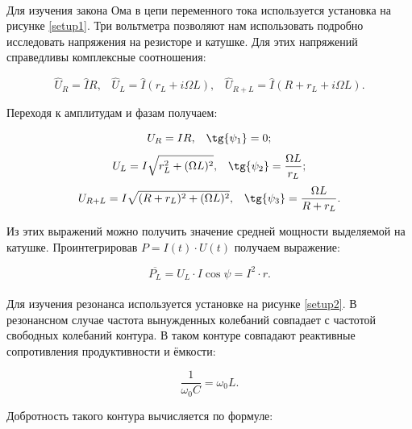 \documentclass[a4paper,12pt]{article} %
\begin{document}
\paragraph{} Для изучения закона Ома в цепи переменного тока используется установка на рисунке \ref{setup1}. Три вольтметра позволяют нам использовать подробно исследовать напряжения на резисторе и катушке. Для этих напряжений справедливы комплексные соотношения:

\begin{equation}
\hat{U}_R = \hat{I} R, \;\;\; \hat{U}_L = \hat{I} (r_L + i \Omega L), \;\;\; \hat{U}_{R+L} = \hat{I} (R + r_L + i\Omega L).
\label{1}
\end{equation}

Переходя к амплитудам и фазам получаем:

\begin{equation}
U_R = IR, \;\;\; \tg{\psi_1} = 0;  \label{2}
\end{equation}
\begin{equation}
U_L = I \sqrt{r_L^2 + (\Omega L)^2}, \;\;\; 	\tg{\psi_2} = \frac{\Omega L}{r_L};  \label{3}
\end{equation}
\begin{equation}
U_{R+L} = I \sqrt{(R + r_L)^2 + (\Omega L)^2}, \;\;\; 	\tg{\psi_3} = \frac{\Omega L}{R + r_L}.  \label{3}
\end{equation}

Из этих выражений можно получить значение средней мощности выделяемой на катушке. Проинтегрировав $P = I(t) \cdot U(t)$ получаем выражение:

\begin{equation}
\overline{P_L} = U_L \cdot I \cos \psi = I^2 \cdot r. \label{5}
\end{equation}

\paragraph{} Для изучения резонанса используется установке на рисунке \ref{setup2}. В резонансном случае частота вынужденных колебаний совпадает с частотой свободных колебаний контура. В таком контуре совпадают реактивные сопротивления продуктивности и ёмкости:

\begin{equation}
\frac{1}{\omega_0 C} = \omega_0 L. \label{6}
\end{equation}

Добротность такого контура вычисляется по формуле:
\end{document}
